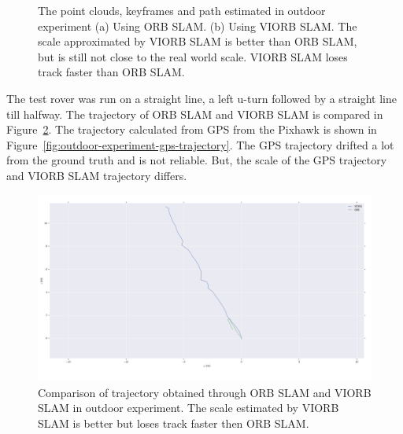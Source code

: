 \begin{figure}[h]
	
	\centering
	\caption[Outdoor experiment.]{\small 
		The point clouds, keyframes and path estimated in outdoor experiment (a) Using ORB SLAM. (b) Using VIORB SLAM. The scale approximated by VIORB SLAM is better than ORB SLAM, but is still not close to the real world scale. VIORB SLAM loses track faster than ORB SLAM. }
	\label{fig:outdoor-path-visualization}
	
\end{figure}

The test rover was run on a straight line, a left u-turn followed by a straight line till halfway.
The trajectory of ORB SLAM and VIORB SLAM is compared in Figure~\ref{fig:outdoor-experiment-trajectory}. The trajectory calculated from GPS from the Pixhawk is shown in  Figure~\ref{fig:outdoor-experiment-gps-trajectory}. The GPS trajectory drifted a lot from the ground truth and is not reliable. But, the scale of the GPS trajectory and VIORB SLAM trajectory differs.

\begin{figure}[h]
	\centering
	\includegraphics[width=5.5in]{figures/demo3_trajectory}
	\caption[Outdoor experiment trajectory]{\small 
		Comparison of trajectory obtained through ORB SLAM and VIORB SLAM in outdoor experiment. The scale estimated by VIORB SLAM is better but loses track faster then ORB SLAM. }
	\label{fig:outdoor-experiment-trajectory}
\end{figure}

